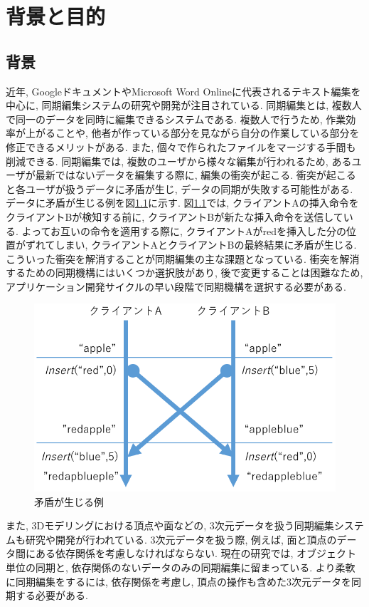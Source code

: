 \chapter{背景と目的}\label{chap:background}

\section{背景}
近年, GoogleドキュメントやMicrosoft Word Onlineに代表されるテキスト編集を中心に, 同期編集システムの研究や開発が注目されている.
同期編集とは, 複数人で同一のデータを同時に編集できるシステムである.
複数人で行うため, 作業効率が上がることや, 他者が作っている部分を見ながら自分の作業している部分を修正できるメリットがある.
また, 個々で作られたファイルをマージする手間も削減できる.
同期編集では, 複数のユーザから様々な編集が行われるため, あるユーザが最新ではないデータを編集する際に, 編集の衝突が起こる. 衝突が起こると各ユーザが扱うデータに矛盾が生じ, データの同期が失敗する可能性がある. データに矛盾が生じる例を図\ref{mujyun}に示す. 図\ref{mujyun}では, クライアントAの挿入命令をクライアントBが検知する前に, クライアントBが新たな挿入命令を送信している. よってお互いの命令を適用する際に, クライアントAがredを挿入した分の位置がずれてしまい, クライアントAとクライアントBの最終結果に矛盾が生じる.
こういった衝突を解消することが同期編集の主な課題となっている.
衝突を解消するための同期機構にはいくつか選択肢があり, 後で変更することは困難なため, アプリケーション開発サイクルの早い段階で同期機構を選択する必要がある.
\begin{figure}[htbp]
  \begin{center}
    \includegraphics[scale=0.5]{images/mujyun}
    \caption{矛盾が生じる例}
    \label{mujyun}
  \end{center}
\end{figure}
\par
また, 3Dモデリングにおける頂点や面などの, 3次元データを扱う同期編集システムも研究や開発が行われている. 3次元データを扱う際, 例えば, 面と頂点のデータ間にある依存関係を考慮しなければならない. 現在の研究では, オブジェクト単位の同期と, 依存関係のないデータのみの同期編集に留まっている. より柔軟に同期編集をするには, 依存関係を考慮し, 頂点の操作も含めた3次元データを同期する必要がある.

